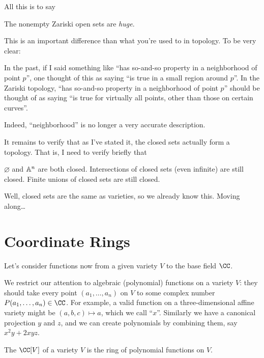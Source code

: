 \documentclass[11pt]{scrreprt}
\begin{document}
All this is to say
\begin{moral}
	The nonempty Zariski open sets are \emph{huge}.
\end{moral}
This is an important difference than what you're used to in topology.
To be very clear:
\begin{itemize}
	\ii In the past, if I said something like ``has so-and-so property in a neighborhood of point $p$'',
	one thought of this as saying ``is true in a small region around $p$''.
	\ii In the Zariski topology, ``has so-and-so property in a neighborhood of point $p$'' should be thought
	of as saying ``is true for virtually all points, other than those on certain curves''.
\end{itemize}
Indeed, ``neighborhood'' is no longer a very accurate description.

It remains to verify that as I've stated it, the closed sets actually form a topology.
That is, I need to verify briefly that
\begin{itemize}
	\ii $\varnothing$ and $\mathbb A^n$ are both closed.
	\ii Intersections of closed sets (even infinite) are still closed.
	\ii Finite unions of closed sets are still closed.
\end{itemize}
Well, closed sets are the same as varieties, so we already know this. Moving along\dots



\section{Coordinate Rings}
Let's consider functions now from a given variety $V$ to the base field $\CC$.

We restrict our attention to algebraic (polynomial) functions on a variety $V$:
they should take every point $(a_1, \dots, a_n)$ on $V$ to some complex number $P(a_1, \dots, a_n) \in \CC$.
For example, a valid function on a three-dimensional affine variety might be $(a,b,c) \mapsto a$,
which we call ``$x$''.
Similarly we have a canonical projection $y$ and $z$,
and we can create polynomials by combining them,
say $x^2y + 2xyz$.

\begin{definition}
	The  $\CC[V]$ of a variety $V$
	is the ring of polynomial functions on $V$.
\end{definition}
\end{document}
